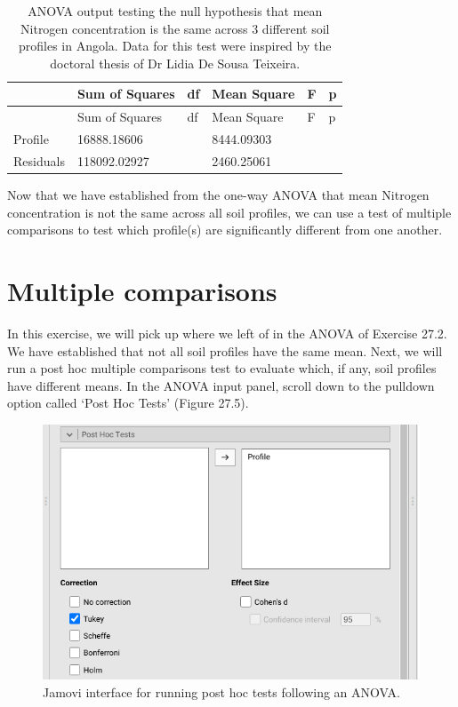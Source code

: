 \documentclass[
]{scrbook}
\begin{document}
\begin{longtable}[]{@{}llllll@{}}
\caption{\label{tab:unnamed-chunk-129}ANOVA output testing the null hypothesis that mean Nitrogen concentration is the same across 3 different soil profiles in Angola. Data for this test were inspired by the doctoral thesis of Dr Lidia De Sousa Teixeira.}\tabularnewline
\toprule
& Sum of Squares & df & Mean Square & F & p \\
\midrule
\endfirsthead
\toprule
& Sum of Squares & df & Mean Square & F & p \\
\midrule
\endhead
Profile & 16888.18606 & & 8444.09303 & & \\
Residuals & 118092.02927 & & 2460.25061 & & \\
\bottomrule
\end{longtable}

Now that we have established from the one-way ANOVA that mean Nitrogen concentration is not the same across all soil profiles, we can use a test of multiple comparisons to test which profile(s) are significantly different from one another.

\hypertarget{multiple-comparisons}{%
\section{Multiple comparisons}\label{multiple-comparisons}}

In this exercise, we will pick up where we left of in the ANOVA of Exercise 27.2.
We have established that not all soil profiles have the same mean.
Next, we will run a post hoc multiple comparisons test to evaluate which, if any, soil profiles have different means.
In the ANOVA input panel, scroll down to the pulldown option called `Post Hoc Tests' (Figure 27.5).

\begin{figure}
\includegraphics[width=1\linewidth]{img/jamovi_multiple_comparisons_input} \caption{Jamovi interface for running post hoc tests following an ANOVA.}\label{fig:unnamed-chunk-130}
\end{figure}
\end{document}
